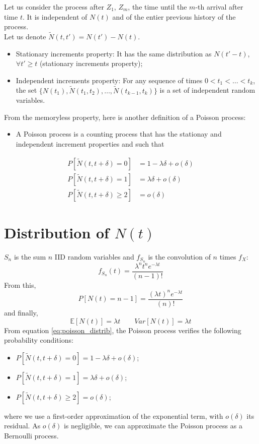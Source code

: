 \documentclass[12pt, openany]{report}
\newcommand{\E}{\mathbb{E}}
\theoremstyle{definition}
\begin{document}
Let us consider the process after $Z_1$, $Z_m$, the time until the $m$-th arrival after time $t$. It is independent of $N(t)$ and of the entier previous history of the process.\\
Let us denote $\tilde N(t,t') = N(t')-N(t)$. 
\begin{itemize}
  \item Stationary increments property: It has the same distribution as $N(t'-t)$, $\forall t'\ge t$ (stationary increments property);
  \item Independent increments property: For any sequence of times $0<t_1<\dots<t_k$, the set $\{N(t_1), \tilde N(t_1,t_2), \dots,\tilde N (t_{k-1}, t_k)\}$ is a set of independent random variables.
\end{itemize}
From the memoryless property, here is another definition of a Poisson process: \\
\begin{itemize}
  \item A Poisson process is a counting process that has the stationay and independent increment properties and such that 
\end{itemize}
\begin{equation}
  \begin{aligned}
    P[\tilde N(t, t+\delta)=0] &= 1-\lambda \delta +o(\delta)\\  P[\tilde N(t, t+\delta)=1] &= \lambda \delta +o(\delta)\\
    P[\tilde N(t, t+\delta)\ge2] &= o(\delta)
  \end{aligned}
\end{equation}
\section{\texorpdfstring{Distribution of $N(t)$}{Distribution of }}
$S_n$ is the sum $n$ IID random variables and $f_{S_n}$ is the convolution of $n$ times $f_X$:
\begin{equation}
  f_{S_n}(t) = \frac{\lambda^n t^{n}e^{-\lambda t}}{(n-1)!}
\end{equation}
From this, 
\begin{equation}\label{eq:poisson_distrib}
  P[N(t)=n-1] = \frac{(\lambda t)^{n}e^{-\lambda t}}{(n)!}
\end{equation}
and finally, 
\begin{equation}
  \E[N(t)] = \lambda t\qquad Var[N(t)] = \lambda t
\end{equation}
From equation \eqref{eq:poisson_distrib}, the Poisson process verifies the following probability conditions:
\begin{itemize}
  \item $P[\tilde N(t,t+\delta)=0]=1-\lambda \delta +o(\delta)$;
  \item $P[\tilde N(t,t+\delta)=1]=\lambda \delta +o(\delta)$;
  \item $P[\tilde N(t,t+\delta)\ge2]=o(\delta)$;
\end{itemize}
where we use a first-order approximation of the exponential term, with $o(\delta)$ its residual. As $o(\delta)$ is negligible, we can approximate the Poisson process as a Bernoulli process. 
\end{document}
